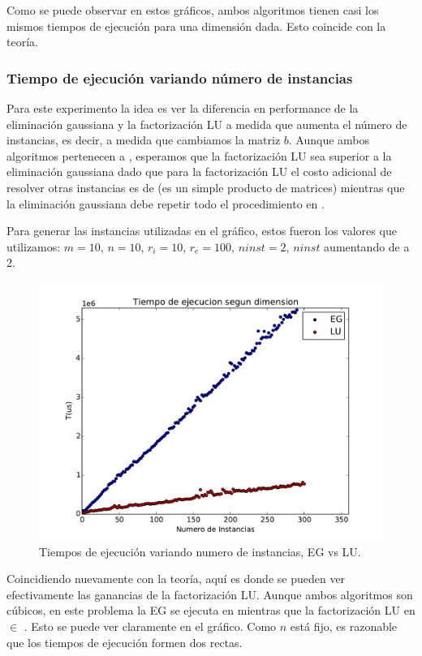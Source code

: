 Como se puede observar en estos gráficos, ambos algoritmos tienen casi los mismos tiempos de ejecución para una dimensión dada. Esto coincide con la teoría.

\pagebreak

\subsubsection{Tiempo de ejecución variando número de instancias}

Para este experimento la idea es ver la diferencia en performance de la eliminación gaussiana y la factorización LU a medida que aumenta el número de instancias, es decir, a medida que cambiamos la matriz $b$. Aunque ambos algoritmos pertenecen a , esperamos que la factorización LU sea superior a la eliminación gaussiana dado que para la factorización LU el costo adicional de resolver otras instancias es de  (es un simple producto de matrices) mientras que la eliminación gaussiana debe repetir todo el procedimiento en .

Para generar las instancias utilizadas en el gráfico, estos fueron los valores que utilizamos: $m = 10$, $n = 10$, $r_i = 10$, $r_e = 100$, $ninst = 2$, $ninst$ aumentando de a 2.

\begin{figure}[h]
\centering
\includegraphics[scale=0.7]{graficos/ninstVariable.pdf}
\caption{Tiempos de ejecución variando numero de instancias, EG vs LU.}
\end{figure}

Coincidiendo nuevamente con la teoría, aquí es donde se pueden ver efectivamente las ganancias de la factorización LU. Aunque ambos algoritmos son cúbicos, en este problema la EG se ejecuta en  mientras que la factorización LU en  $\in$ . Esto se puede ver claramente en el gráfico. Como $n$ está fijo, es razonable que los tiempos de ejecución formen dos rectas.

